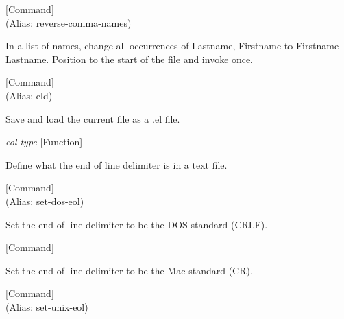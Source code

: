 \vspace{1em}
\noindent
{}
\usebox{\funcname}
 \hfill [Command]\\%
 (Alias: reverse-comma-names)

\begin{doc-string}
In a list of names, change all occurrences
of Lastname, Firstname to Firstname Lastname.
Position to the start of the file and invoke once.
\end{doc-string}

\vspace{1em}
\noindent
{}
\usebox{\funcname}
 \hfill [Command]\\%
 (Alias: eld)

\begin{doc-string}
Save and load the current file as a .el file.
\end{doc-string}

\vspace{1em}
\noindent
{}
\usebox{\funcname}\emph{eol-type}
 \hfill [Function]

\begin{doc-string}
Define what the end of line delimiter is in a text file.
\end{doc-string}

\vspace{1em}
\noindent
{}
\usebox{\funcname}
 \hfill [Command]\\%
 (Alias: set-dos-eol)

\begin{doc-string}
Set the end of line delimiter to be the DOS standard (CRLF).
\end{doc-string}

\vspace{1em}
\noindent
{}
\usebox{\funcname}
 \hfill [Command]

\begin{doc-string}
Set the end of line delimiter to be the Mac standard (CR).
\end{doc-string}

\vspace{1em}
\noindent
{}
\usebox{\funcname}
 \hfill [Command]\\%
 (Alias: set-unix-eol)

